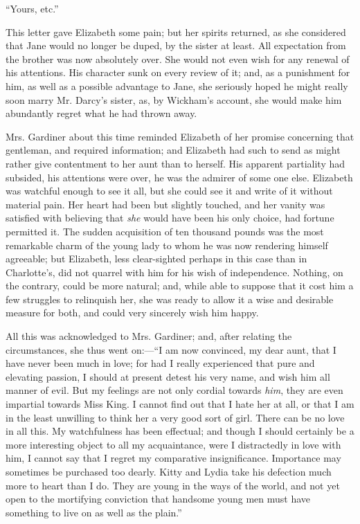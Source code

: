 \documentclass[12pt]{book}
\begin{document}
``Yours, etc.''

This letter gave Elizabeth some pain; but her spirits returned, as she considered that Jane would no longer be duped, by the sister at least. All expectation from the brother was now absolutely over. She would not even wish for any renewal of his attentions. His character sunk on every review of it; and, as a punishment for him, as well as a possible advantage to Jane, she seriously hoped he might really soon marry Mr. Darcy's sister, as, by Wickham's account, she would make him abundantly regret what he had thrown away.

Mrs. Gardiner about this time reminded Elizabeth of her promise concerning that gentleman, and required information; and Elizabeth had such to send as might rather give contentment to her aunt than to herself. His apparent partiality had subsided, his attentions were over, he was the admirer of some one else. Elizabeth was watchful enough to see it all, but she could see it and write of it without material pain. Her heart had been but slightly touched, and her vanity was satisfied with believing that \textit{she} would have been his only choice, had fortune permitted it. The sudden acquisition of ten thousand pounds was the most remarkable charm of the young lady to whom he was now rendering himself agreeable; but Elizabeth, less clear-sighted perhaps in this case than in Charlotte's, did not quarrel with him for his wish of independence. Nothing, on the contrary, could be more natural; and, while able to suppose that it cost him a few struggles to relinquish her, she was ready to allow it a wise and desirable measure for both, and could very sincerely wish him happy.

All this was acknowledged to Mrs. Gardiner; and, after relating the circumstances, she thus went on:---``I am now convinced, my dear aunt, that I have never been much in love; for had I really experienced that pure and elevating passion, I should at present detest his very name, and wish him all manner of evil. But my feelings are not only cordial towards \textit{him}, they are even impartial towards Miss King. I cannot find out that I hate her at all, or that I am in the least unwilling to think her a very good sort of girl. There can be no love in all this. My watchfulness has been effectual; and though I should certainly be a more interesting object to all my acquaintance, were I distractedly in love with him, I cannot say that I regret my comparative insignificance. Importance may sometimes be purchased too dearly. Kitty and Lydia take his defection much more to heart than I do. They are young in the ways of the world, and not yet open to the mortifying conviction that handsome young men must have something to live on as well as the plain.''
\end{document}
